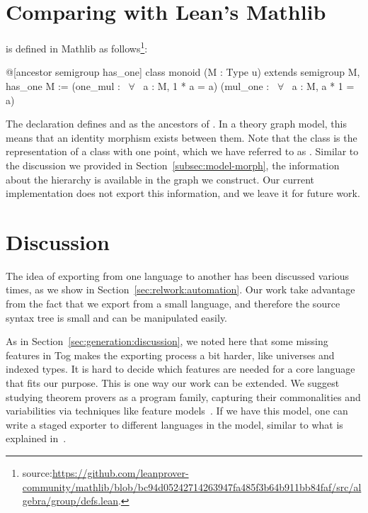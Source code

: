 
\section{Comparing with Lean's Mathlib}
 is defined in Mathlib as follows\footnote{source:\url{https://github.com/leanprover-community/mathlib/blob/bc94d05242714263947fa485f3b64b911bb84faf/src/algebra/group/defs.lean}.}: 
\begin{leancode} 
@[ancestor semigroup has_one]
class monoid (M : Type u) extends semigroup M, has_one M :=
  (one_mul : ~$\forall$~ a : M, 1 * a = a) (mul_one : ~$\forall$~ a : M, a * 1 = a)
\end{leancode} 
The declaration  defines  and  as the ancestors of . In a theory graph model, this means that an identity morphism exists between them. Note that the  class is the representation of a class with one point, which we have referred to as . 
Similar to the discussion we provided in Section~\ref{subsec:model-morph}, the information about the hierarchy is available in the graph we construct. Our current implementation does not export this information, and we leave it for future work. 

\section{Discussion}
\label{sec:exporting:discussion}
The idea of exporting from one language to another has been discussed various times, as we show in Section~\ref{sec:relwork:automation}. Our work take advantage from the fact that we export from a small language, and therefore the source syntax tree is small and can be manipulated easily.  

As in Section~\ref{sec:generation:discussion}, we noted here that some missing features in Tog makes the exporting process a bit harder, like universes and indexed types. It is hard to decide which features are needed for a core language that fits our purpose. This is one way our work can be extended. We suggest studying theorem provers as a program family, capturing their commonalities and variabilities via techniques like feature models~\cite{czarnecki2000generative}. If we have this model, one can write a staged exporter to different languages in the model, similar to what is explained in~\cite{stagedConfig}. 

